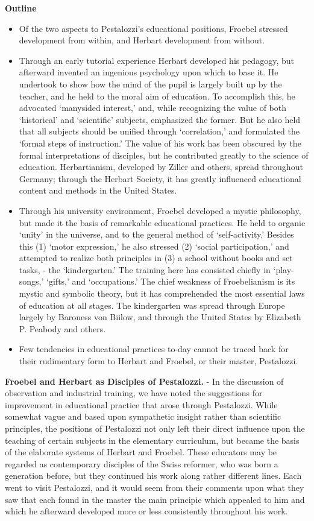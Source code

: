 \documentclass[
]{book}
\providecommand{\tightlist}{%
  \setlength{\itemsep}{0pt}\setlength{\parskip}{0pt}}
\begin{document}
\textbf{Outline}

\begin{itemize}
\tightlist
\item
  Of the two aspects to Pestalozzi's educational positions, Froebel stressed development from within, and Herbart development from without.
\item
  Through an early tutorial experience Herbart developed his pedagogy, but afterward invented an ingenious psychology upon which to base it. He undertook to show how the mind of the pupil is largely built up by the teacher, and he held to the moral aim of education. To accomplish this, he advocated `manysided interest,' and, while recognizing the value of both `historical' and `scientific' subjects, emphasized the former. But he also held that all subjects should be unified through `correlation,' and formulated the `formal steps of instruction.' The value of his work has been obscured by the formal interpretations of disciples, but he contributed greatly to the science of education. Herbartianism, developed by Ziller and others, spread throughout Germany; through the Herbart Society, it has greatly influenced educational content and methods in the United States.
\item
  Through his university environment, Froebel developed a mystic philosophy, but made it the basis of remarkable educational practices. He held to organic `unity' in the universe, and to the general method of `self-activity.' Besides this (1) `motor expression,' he also stressed (2) `social participation,' and attempted to realize both principles in (3) a school without books and set tasks, - the `kindergarten.' The training here has consisted chiefly in `play-songs,' `gifts,' and `occupations.' The chief weakness of Froebelianism is its mystic and symbolic theory, but it has comprehended the most essential laws of education at all stages. The kindergarten was spread through Europe largely by Baroness von Biilow, and through the United States by Elizabeth P. Peabody and others.
\item
  Few tendencies in educational practices to-day cannot be traced back for their rudimentary form to Herbart and Froebel, or their master, Pestalozzi.
\end{itemize}

\textbf{Froebel and Herbart as Disciples of Pestalozzi.} - In the discussion of observation and industrial training, we have noted the suggestions for improvement in educational practice that arose through Pestalozzi. While somewhat vague and based upon sympathetic insight rather than scientific principles, the positions of Pestalozzi not only left their direct influence upon the teaching of certain subjects in the elementary curriculum, but became the basis of the elaborate systems of Herbart and Froebel. These educators may be regarded as contemporary disciples of the Swiss reformer, who was born a generation before, but they continued his work along rather different lines. Each went to visit Pestalozzi, and it would seem from their comments upon what they saw that each found in the master the main principie which appealed to him and which he afterward developed more or less consistently throughout his work.
\end{document}
